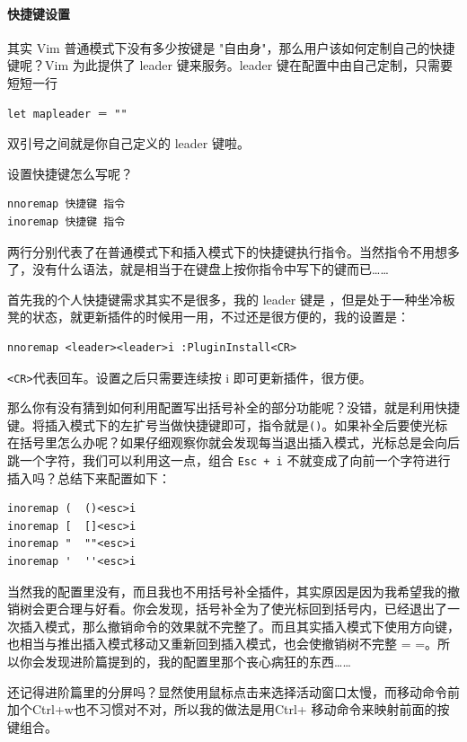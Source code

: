 \paragraph{快捷键设置}

其实 Vim 普通模式下没有多少按键是 "自由身"，那么用户该如何定制自己的快捷键呢？Vim 为此提供了 leader 键来服务。leader 键在配置中由自己定制，只需要短短一行

\begin{verbatim}
let mapleader ＝ ""
\end{verbatim}

双引号之间就是你自己定义的 leader 键啦。

设置快捷键怎么写呢？

\begin{verbatim}
nnoremap 快捷键 指令
inoremap 快捷键 指令
\end{verbatim}

两行分别代表了在普通模式下和插入模式下的快捷键执行指令。当然指令不用想多了，没有什么语法，就是相当于在键盘上按你指令中写下的键而已……

首先我的个人快捷键需求其实不是很多，我的 leader 键是 ，但是处于一种坐冷板凳的状态，就更新插件的时候用一用，不过还是很方便的，我的设置是：

\begin{verbatim}
nnoremap <leader><leader>i :PluginInstall<CR>
\end{verbatim}

\texttt{<CR>}代表回车。设置之后只需要连续按 \texttt{}i 即可更新插件，很方便。

那么你有没有猜到如何利用配置写出括号补全的部分功能呢？没错，就是利用快捷键。将插入模式下的左扩号当做快捷键即可，指令就是\texttt{()}。如果补全后要使光标在括号里怎么办呢？如果仔细观察你就会发现每当退出插入模式，光标总是会向后跳一个字符，我们可以利用这一点，组合 \texttt{Esc + i} 不就变成了向前一个字符进行插入吗？总结下来配置如下：

\begin{verbatim}
inoremap (  ()<esc>i
inoremap [  []<esc>i
inoremap "  ""<esc>i
inoremap '  ''<esc>i
\end{verbatim}

当然我的配置里没有，而且我也不用括号补全插件，其实原因是因为我希望我的撤销树会更合理与好看。你会发现，括号补全为了使光标回到括号内，已经退出了一次插入模式，那么撤销命令的效果就不完整了。而且其实插入模式下使用方向键，也相当与推出插入模式移动又重新回到插入模式，也会使撤销树不完整 = =。所以你会发现进阶篇提到的，我的配置里那个丧心病狂的东西……

还记得进阶篇里的分屏吗？显然使用鼠标点击来选择活动窗口太慢，而移动命令前加个Ctrl+w也不习惯对不对，所以我的做法是用Ctrl+ 移动命令来映射前面的按键组合。

